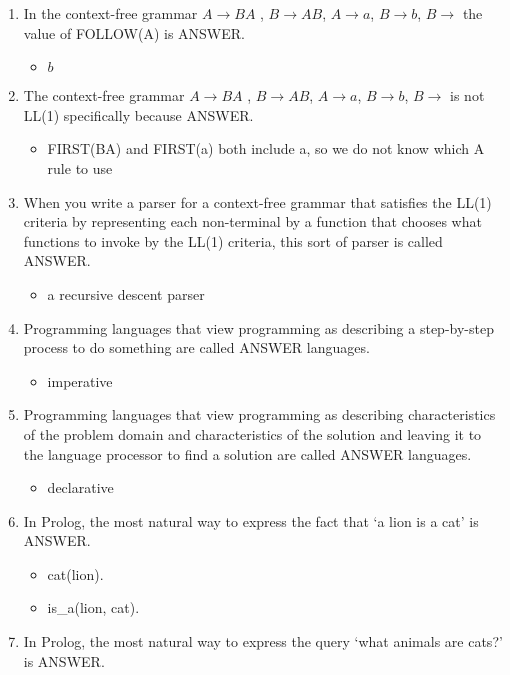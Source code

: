 \documentclass{exam}
\begin{document}
\begin{enumerate}
\begin{itemize}
\end{itemize}
\item In the context-free grammar $A \rightarrow B A$ , $B \rightarrow A B$, $A \rightarrow a$, $B \rightarrow b$, $B \rightarrow$  the value of FOLLOW(A) is ANSWER.
\begin{itemize}
\item ${b}$
\end{itemize}
\item The context-free grammar $A \rightarrow B A$ , $B \rightarrow A B$, $A \rightarrow a$, $B \rightarrow b$, $B \rightarrow$  is not LL(1) specifically because ANSWER.
\begin{itemize}
\item FIRST(BA) and FIRST(a) both include a, so we do not know which A rule to use
\end{itemize}
\item When you write a parser for a context-free grammar that satisfies the LL(1) criteria by representing each non-terminal by a function that chooses what functions to invoke by the LL(1) criteria, this sort of parser is called ANSWER.
\begin{itemize}
\item a recursive descent parser
\end{itemize}
\item Programming languages that view programming as describing a step-by-step process to do something are called ANSWER languages.
\begin{itemize}
\item imperative
\end{itemize}
\item Programming languages that view programming as describing characteristics of the problem domain and characteristics of the solution and leaving it to the language processor to find a solution are called ANSWER languages.
\begin{itemize}
\item declarative
\end{itemize}
\item In Prolog, the most natural way to express the fact that `a lion is a cat' is ANSWER.
\begin{itemize}
\item cat(lion).
\item is\_a(lion, cat).
\end{itemize}
\item In Prolog, the most natural way to express the query `what animals are cats?' is ANSWER.
\begin{itemize}

\end{itemize}
\end{enumerate}
\end{document}
